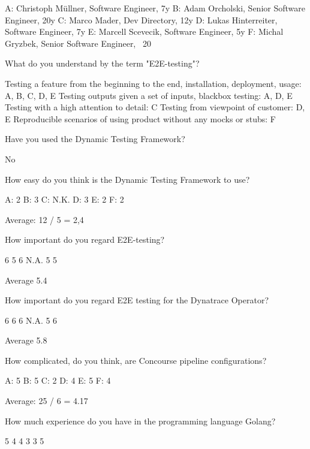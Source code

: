 A: Christoph Müllner, Software Engineer, 7y
B: Adam Orcholski, Senior Software Engineer, 20y
C: Marco Mader, Dev Directory, 12y
D: Lukas Hinterreiter, Software Engineer, 7y
E: Marcell Scevecik, Software Engineer, 5y
F: Michal Gryzbek, Senior Software Engineer, ~20

What do you understand by the term "E2E-testing"?

Testing a feature from the beginning to the end, installation, deployment, usage: A, B, C, D, E
Testing outputs given a set of inputs, blackbox testing: A, D, E
Testing with a high attention to detail: C
Testing from viewpoint of customer: D, E
Reproducible scenarios of using product without any mocks or stubs: F


Have you used the Dynamic Testing Framework?

No


How easy do you think is the Dynamic Testing Framework to use?

A: 2
B: 3
C: N.K.
D: 3
E: 2
F: 2

Average: 12 / 5 = 2,4


How important do you regard E2E-testing?

6
5
6
N.A.
5
5

Average 5.4

How important do you regard E2E testing for the Dynatrace Operator?

6
6
6
N.A.
5
6

Average 5.8

How complicated, do you think, are Concourse pipeline configurations?

A: 5
B: 5
C: 2
D: 4
E: 5
F: 4

Average: 25 / 6 = 4.17

How much experience do you have in the programming language Golang?

5
4
4
3
3
5